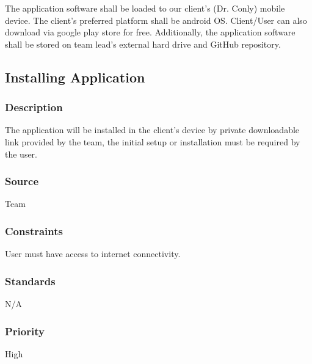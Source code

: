 The application software shall be loaded to our client's (Dr. Conly) mobile device. The client's preferred platform shall be android OS. Client/User can also download via google play store for free. Additionally, the application software shall be stored on team lead's external hard drive and GitHub repository.  

\subsection{Installing Application}
\subsubsection{Description}
The application will be installed in the client's device by private downloadable link provided by the team, the initial setup or installation must be required by the user.   
\subsubsection{Source}
Team
\subsubsection{Constraints}
User must have access to internet connectivity. 
\subsubsection{Standards}
N/A
\subsubsection{Priority}
High